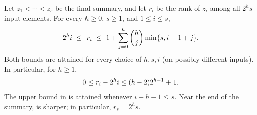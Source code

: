 \begin{lemma}
    Let $z_1<\cdots<z_s$ be the final summary, and let $r_i$ be the
    rank of $z_i$ among all $2^h s$ input elements. For every
    $h\geq 0$, $s\geq 1$, and $1\leq i\leq s$,
    \begin{equation}
        \eqlab{thinning:exact:ranks}
        2^h i
        \ \leq\ r_i\ \leq\
        1+\sum_{j=0}^{h}\binom{h}{j}\min\{s,i-1+j\}.
    \end{equation}
    Both bounds are attained for every choice of $h,s,i$ (on possibly
    different inputs). In particular, for $h\geq 1$,
    \begin{equation}
        \eqlab{thinning:uniform:error}
        0\leq r_i-2^h i\leq (h-2)2^{h-1}+1.
    \end{equation}
    The upper bound in  is attained
    whenever $i+h-1\leq s$. Near the end of the summary,
     is sharper; in particular,
    $r_s=2^h s$.
\end{lemma}

